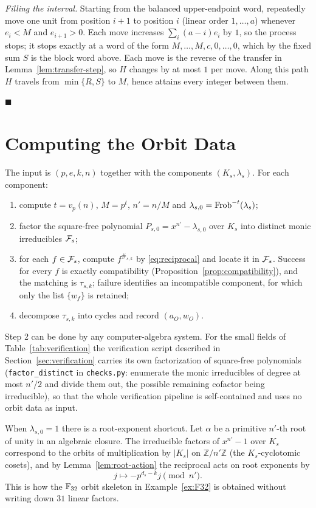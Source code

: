 \emph{Filling the interval.}  Starting from the balanced upper-endpoint word,
repeatedly move one unit from position $i+1$ to position $i$ (linear order
$1,\ldots,a$) whenever $e_i<M$ and $e_{i+1}>0$.  Each move increases
$\sum_i(a-i)e_i$ by $1$, so the process stops; it stops exactly at a word of
the form $M,\ldots,M,c,0,\ldots,0$, which by the fixed sum $S$ is the block
word above.  Each move is the reverse of the transfer in
Lemma~\ref{lem:transfer-step}, so $H$ changes by at most $1$ per move.  Along
this path $H$ travels from $\min\{R,S\}$ to $M$, hence attains every integer
between them.

\hfill$\blacksquare$

\section{Computing the Orbit Data}\label{sec:orbit-data}

The input is $(p,e,k,n)$ together with the components $(K_s,\lambda_s)$.
For each component:
\begin{enumerate}
\item compute $t=v_p(n)$, $M=p^t$, $n'=n/M$ and
  $\lambda_{s,0}=\operatorname{Frob}^{-t}(\lambda_s)$;
\item factor the square-free polynomial $P_{s,0}=x^{n'}-\lambda_{s,0}$ over
  $K_s$ into distinct monic irreducibles $\mathcal F_s$;
\item for each $f\in\mathcal F_s$, compute $f^{\#_{s,k}}$ by \eqref{eq:reciprocal} and
  locate it in $\mathcal F_s$.  Success for every $f$ is exactly compatibility
  (Proposition~\ref{prop:compatibility}), and the matching is $\tau_{s,k}$;
  failure identifies an incompatible component, for which only the list
  $\{w_f\}$ is retained;
\item decompose $\tau_{s,k}$ into cycles and record $(a_O,w_O)$.
\end{enumerate}
Step 2 can be done by any computer-algebra system.  For the small fields of
Table~\ref{tab:verification} the verification script described in
Section~\ref{sec:verification} carries its own
factorization of square-free polynomials (\texttt{factor\_distinct} in
\texttt{checks.py}: enumerate the monic irreducibles of degree at most
$n'/2$ and divide them out, the possible remaining cofactor being
irreducible), so that the whole verification pipeline is self-contained and
uses no orbit data as input.

When $\lambda_{s,0}=1$ there is a root-exponent shortcut.  Let $\alpha$ be a
primitive $n'$-th root of unity in an algebraic closure.  The irreducible
factors of $x^{n'}-1$ over $K_s$ correspond to the orbits of multiplication by
$|K_s|$ on $\mathbb{Z}/n'\mathbb{Z}$ (the $K_s$-cyclotomic cosets), and by
Lemma~\ref{lem:root-action} the reciprocal acts on root exponents by
\begin{equation}\label{eq:root-exponents}
j\longmapsto -p^{d_s-k}j\pmod{n'}.
\end{equation}
This is how the $\mathbb F_{32}$ orbit skeleton in Example~\ref{ex:F32} is obtained
without writing down $31$ linear factors.
